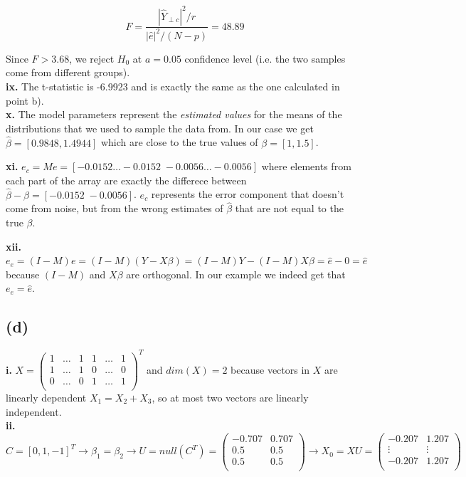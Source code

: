 \documentclass[12pt,a4paper,oneside]{report}
\begin{document}
$$F = \frac{|\hat{Y}_{\perp c}|^2 / r}{|\hat{e}|^2 / (N - p)} = 48.89$$

Since $F > 3.68$, we reject $H_0$ at $a = 0.05$ confidence level (i.e. the two samples come from different groups).\\

\textbf{ix.} The t-statistic is -6.9923 and is exactly the same as the one calculated in point b). \\

\textbf{x. } The model parameters represent the \emph{estimated values} for the means of the distributions that we used to sample the data from. In our case we get $\hat{\beta} = [0.9848, 1.4944]$ which are close to the true values of $\beta = [1, 1.5]$.

\textbf{xi. } $e_c = M e = [-0.0152 \dots -0.0152 \; -0.0056 \dots -0.0056 ]$ where elements from each part of the array are exactly the differece between $\hat{\beta} - \beta = [-0.0152 \; -0.0056]$. $e_c$ represents the error component that doesn't come from noise, but from the wrong estimates of $\hat{\beta}$ that are not equal to the true $\beta$.

\textbf{xii. } $e_e = (I - M) e = (I - M) (Y - X\beta) = (I - M)Y - (I - M)X\beta = \hat{e} - 0 = \hat{e}$ because $(I-M)$ and $X\beta$ are orthogonal. In our example we indeed get that $e_e = \hat{e}$. %

\subsection*{(d)}

\textbf{i. } $X = \begin{pmatrix}
1 & \dots & 1 & 1 & \dots & 1\\
1 & \dots & 1 & 0 & \dots & 0\\
0 & \dots & 0 & 1 & \dots & 1\\
\end{pmatrix}^T$ and $dim(X) = 2$ because vectors in $X$ are linearly dependent $X_1 = X_2 + X_3$, so at most two vectors are linearly independent. \\

\textbf{ii. } $C = [0, 1, -1]^T \to \beta_1 = \beta_2 \to U = null(C^T) = \begin{pmatrix}
-0.707 & 0.707\\
0.5 & 0.5\\
0.5 & 0.5\\
\end{pmatrix} \to X_0 = X U = \begin{pmatrix}
-0.207 & 1.207\\
\vdots & \vdots\\
-0.207 & 1.207\\
\end{pmatrix}$
\end{document}
